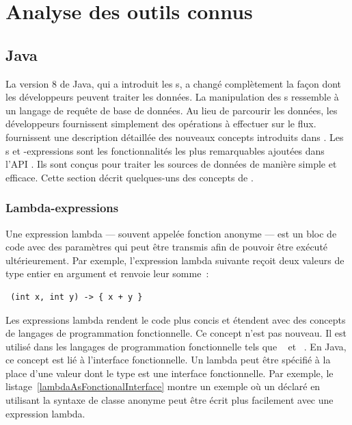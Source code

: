 
\chapter{Analyse des outils connus}
\label{outils_connus}



\section{Java}

La version 8 de Java, qui a introduit les s, a chang\'e compl\`etement la façon dont les d\'eveloppeurs peuvent traiter les donn\'ees. La manipulation des s ressemble \`a un langage de requ\^ete de base de donn\'ees. Au lieu de parcourir les donn\'ees, les d\'eveloppeurs fournissent simplement des op\'erations \`a effectuer sur le flux. \cite{urma2014java} fournissent une description d\'etaill\'ee des nouveaux concepts introduits dans . Les  s et -expressions sont les fonctionnalit\'es les plus remarquables ajout\'ees dans l'API \citep{javaStreamAPI}. Ils sont con\c{c}us pour traiter les sources de donn\'ees de mani\`ere simple et efficace. Cette section d\'ecrit quelques-uns des concepts de .


\subsection{Lambda-expressions}

Une expression lambda --- souvent appel\'ee fonction anonyme --- est un bloc de code avec des param\`etres qui peut \^etre transmis afin de pouvoir \^etre ex\'ecut\'e ult\'erieurement. Par exemple, l'expression lambda suivante re\c{c}oit deux valeurs de type entier en argument et renvoie leur somme~:
{\small
\begin{lstlisting}
 (int x, int y) -> { x + y }
\end{lstlisting}
} 



Les expressions lambda rendent le code plus concis et \'etendent  avec des concepts de langages de programmation fonctionnelle. Ce concept n'est pas nouveau. Il est utilis\'e dans les langages de programmation fonctionnelle tels que ~\citep{hutton2016programming} et ~\citep{steele1990common}. En Java, ce concept est li\'e \`a l'interface fonctionnelle. Un lambda peut \^etre sp\'ecifi\'e \`a la place d'une valeur dont le type est une interface fonctionnelle. Par exemple, le listage~\ref{lambdaAsFonctionalInterface} montre un exemple o\`u un  d\'eclar\'e en utilisant la syntaxe de classe anonyme peut \^etre \'ecrit plus facilement avec une expression lambda.

